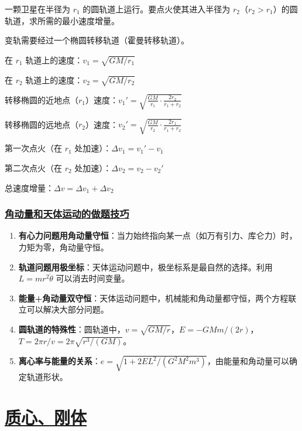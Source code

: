 \begin{example}[卫星轨道变轨]
    一颗卫星在半径为 $r_1$ 的圆轨道上运行。要点火使其进入半径为 $r_2$（$r_2 > r_1$）的圆轨道，求所需的最小速度增量。
    \begin{solution}
        变轨需要经过一个椭圆转移轨道（霍曼转移轨道）。
        
        在 $r_1$ 轨道上的速度：$v_1 = \sqrt{GM/r_1}$
        
        在 $r_2$ 轨道上的速度：$v_2 = \sqrt{GM/r_2}$
        
        转移椭圆的近地点（$r_1$）速度：$v_1' = \sqrt{\frac{GM}{r_1}\cdot\frac{2r_2}{r_1+r_2}}$
        
        转移椭圆的远地点（$r_2$）速度：$v_2' = \sqrt{\frac{GM}{r_2}\cdot\frac{2r_1}{r_1+r_2}}$
        
        第一次点火（在 $r_1$ 处加速）：$\Delta v_1 = v_1' - v_1$
        
        第二次点火（在 $r_2$ 处加速）：$\Delta v_2 = v_2 - v_2'$
        
        总速度增量：$\Delta v = \Delta v_1 + \Delta v_2$
    \end{solution}
\end{example}

\subsubsection{\protect\hyperlink{:}{角动量和天体运动的做题技巧}}

\begin{enumerate}
    \item \textbf{有心力问题用角动量守恒}：当力始终指向某一点（如万有引力、库仑力）时，力矩为零，角动量守恒。
    \item \textbf{轨道问题用极坐标}：天体运动问题中，极坐标系是最自然的选择。利用 $L = mr^2\dot{\theta}$ 可以消去时间变量。
    \item \textbf{能量+角动量双守恒}：天体运动问题中，机械能和角动量都守恒，两个方程联立可以解决大部分问题。
    \item \textbf{圆轨道的特殊性}：圆轨道中，$v = \sqrt{GM/r}$，$E = -GMm/(2r)$，$T = 2\pi r/v = 2\pi\sqrt{r^3/(GM)}$。
    \item \textbf{离心率与能量的关系}：$e = \sqrt{1 + 2EL^2/(G^2M^2m^3)}$，由能量和角动量可以确定轨道形状。
\end{enumerate}


\newpage
\section{\protect\hyperlink{:}{质心、刚体}}

